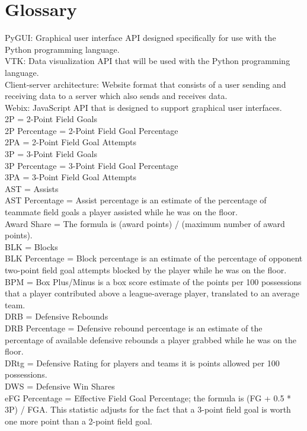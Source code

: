 \documentclass[journal,onecolumn]{IEEEtran}
\begin{document}
\section{Glossary}
PyGUI: Graphical user interface API designed specifically for use with the Python programming language. \\
VTK: Data visualization API that will be used with the Python programming language. \\
Client-server architecture: Website format that consists of a user sending and receiving data to a server which also sends and receives data. \\
Webix: JavaScript API that is designed to support graphical user interfaces. \\
2P = 2-Point Field Goals \\
2P Percentage = 2-Point Field Goal Percentage\\
2PA = 2-Point Field Goal Attempts\\
3P = 3-Point Field Goals\\
3P Percentage = 3-Point Field Goal Percentage\\
3PA = 3-Point Field Goal Attempts\\
AST = Assists\\
AST Percentage = Assist percentage is an estimate of the percentage of teammate field goals a player assisted while he was on the floor.\\
Award Share = The formula is (award points) / (maximum number of award points).\\ 
BLK = Blocks \\
BLK Percentage = Block percentage is an estimate of the percentage of opponent two-point field goal attempts blocked by the player while he was on the floor.\\
BPM = Box Plus/Minus is a box score estimate of the points per 100 possessions that a player contributed above a league-average player, translated to an average team.\\ 
DRB = Defensive Rebounds \\
DRB Percentage = Defensive rebound percentage is an estimate of the percentage of available defensive rebounds a player grabbed while he was on the floor.\\
DRtg = Defensive Rating for players and teams it is points allowed per 100 possessions. \\
DWS = Defensive Win Shares\\
eFG Percentage = Effective Field Goal Percentage; the formula is (FG + 0.5 * 3P) / FGA. This statistic adjusts for the fact that a 3-point field goal is worth one more point than a 2-point field goal. \\
\end{document}

